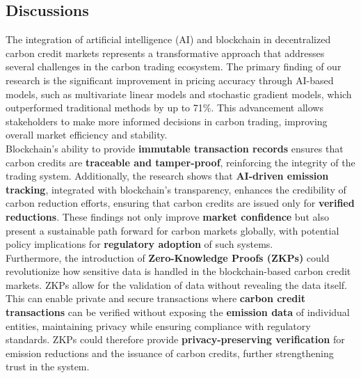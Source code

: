 \documentclass[preprint,12pt]{elsarticle}
\begin{document}
\subsection{Discussions}
The integration of artificial intelligence (AI) and blockchain in decentralized carbon credit markets represents a transformative approach that addresses several challenges in the carbon trading ecosystem. The primary finding of our research is the significant improvement in pricing accuracy through AI-based models, such as multivariate linear models and stochastic gradient models, which outperformed traditional methods by up to 71\%. This advancement allows stakeholders to make more informed decisions in carbon trading, improving overall market efficiency and stability.\\
Blockchain's ability to provide \textbf{immutable transaction records} ensures that carbon credits are \textbf{traceable and tamper-proof}, reinforcing the integrity of the trading system. Additionally, the research shows that \textbf{AI-driven emission tracking}, integrated with blockchain's transparency, enhances the credibility of carbon reduction efforts, ensuring that carbon credits are issued only for \textbf{verified reductions}. These findings not only improve \textbf{market confidence} but also present a sustainable path forward for carbon markets globally, with potential policy implications for \textbf{regulatory adoption} of such systems.\\
Furthermore, the introduction of \textbf{Zero-Knowledge Proofs (ZKPs)} could revolutionize how sensitive data is handled in the blockchain-based carbon credit markets. ZKPs allow for the validation of data without revealing the data itself. This can enable private and secure transactions where \textbf{carbon credit transactions} can be verified without exposing the \textbf{emission data} of individual entities, maintaining privacy while ensuring compliance with regulatory standards. ZKPs could therefore provide \textbf{privacy-preserving verification} for emission reductions and the issuance of carbon credits, further strengthening trust in the system.
\end{document}
